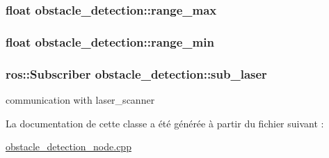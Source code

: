 \subsubsection[{\texorpdfstring{range\+\_\+max}{range_max}}]{\setlength{\rightskip}{0pt plus 5cm}float obstacle\+\_\+detection\+::range\+\_\+max\hspace{0.3cm}{\ttfamily [private]}}\hypertarget{classobstacle__detection_a07b528b9821c2a024b6d4cf9a981f5cd}{}\label{classobstacle__detection_a07b528b9821c2a024b6d4cf9a981f5cd}
\subsubsection[{\texorpdfstring{range\+\_\+min}{range_min}}]{\setlength{\rightskip}{0pt plus 5cm}float obstacle\+\_\+detection\+::range\+\_\+min\hspace{0.3cm}{\ttfamily [private]}}\hypertarget{classobstacle__detection_aa3b8ad63f9db233e9c54e3e793533c1e}{}\label{classobstacle__detection_aa3b8ad63f9db233e9c54e3e793533c1e}
\subsubsection[{\texorpdfstring{sub\+\_\+laser}{sub_laser}}]{\setlength{\rightskip}{0pt plus 5cm}ros\+::\+Subscriber obstacle\+\_\+detection\+::sub\+\_\+laser\hspace{0.3cm}{\ttfamily [private]}}\hypertarget{classobstacle__detection_a6039f3306a252f69e94bdbbcd6b2586a}{}\label{classobstacle__detection_a6039f3306a252f69e94bdbbcd6b2586a}
communication with laser\+\_\+scanner 

La documentation de cette classe a été générée à partir du fichier suivant \+:\begin{DoxyCompactItemize}
\item 
\hyperlink{obstacle__detection__node_8cpp}{obstacle\+\_\+detection\+\_\+node.\+cpp}\end{DoxyCompactItemize}
